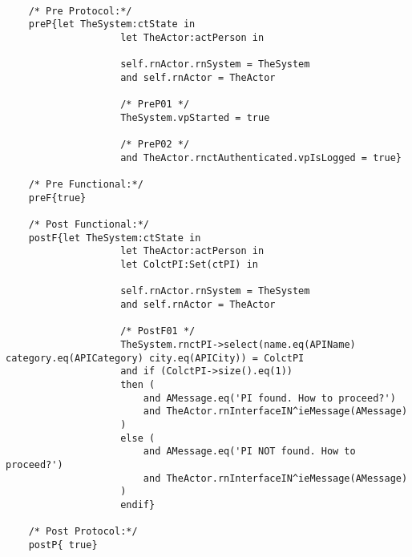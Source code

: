 	\scriptsize
	\vspace{0.5cm}
	\begin{lstlisting}[style=MessirStyle,firstnumber=auto,captionpos=b,caption={\msrmessir (MCL-oriented) specification of the operation \emph{oeSearchPI}.},label=OM-actPerson-oeSearchPI-MCL-LST]

	/* Pre Protocol:*/ 
	preP{let TheSystem:ctState in
					let TheActor:actPerson in
					
					self.rnActor.rnSystem = TheSystem
					and self.rnActor = TheActor
					
					/* PreP01 */
					TheSystem.vpStarted = true
					
					/* PreP02 */
					and TheActor.rnctAuthenticated.vpIsLogged = true}
	
	/* Pre Functional:*/
	preF{true}
	
	/* Post Functional:*/ 
	postF{let TheSystem:ctState in
					let TheActor:actPerson in
					let ColctPI:Set(ctPI) in
					
					self.rnActor.rnSystem = TheSystem
					and self.rnActor = TheActor
					
					/* PostF01 */
					TheSystem.rnctPI->select(name.eq(APIName) category.eq(APICategory) city.eq(APICity)) = ColctPI
					and if (ColctPI->size().eq(1))
					then (
						and AMessage.eq('PI found. How to proceed?')
						and TheActor.rnInterfaceIN^ieMessage(AMessage)
					)
					else (
						and AMessage.eq('PI NOT found. How to proceed?')
						and TheActor.rnInterfaceIN^ieMessage(AMessage)
					)
					endif}
	
	/* Post Protocol:*/ 
	postP{ true}
	
	\end{lstlisting}
	\normalsize 
	
	
	
	





